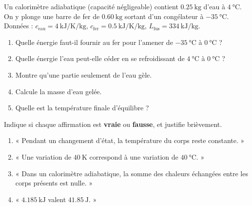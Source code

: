\documentclass[11pt,a4paper]{article}
\begin{document}
\begin{exo}
Un calorimètre adiabatique (capacité négligeable) contient $\qty{0.25}{\kilogram}$ d'eau à $\qty{4}{\celsius}$. On y plonge une barre de fer de $\qty{0.60}{\kilogram}$ sortant d'un congélateur à $\qty{-35}{\celsius}$. Données : $c_{\text{eau}}=\qty{4}{\kilo\joule\per\kelvin\per\kilogram}$, $c_{\text{fer}}=\qty{0.5}{\kilo\joule\per\kelvin\per\kilogram}$, $L_{\text{fus}}=\qty{334}{\kilo\joule\per\kilogram}$.
\begin{enumerate}[label=\alph*)]
  \item Quelle énergie faut-il fournir au fer pour l'amener de $\qty{-35}{\celsius}$ à $\qty{0}{\celsius}$ ?
  \item Quelle énergie l'eau peut-elle céder en se refroidissant de $\qty{4}{\celsius}$ à $\qty{0}{\celsius}$ ?
  \item Montre qu'une partie seulement de l'eau gèle.
  \item Calcule la masse d'eau gelée.
  \item Quelle est la température finale d'équilibre ?
\end{enumerate}
\end{exo}

\begin{exo}
Indique si chaque affirmation est \textbf{vraie} ou \textbf{fausse}, et justifie brièvement.
\begin{enumerate}[label=\alph*)]
  \item « Pendant un changement d'état, la température du corps reste constante. »
  \item « Une variation de $\qty{40}{\kelvin}$ correspond à une variation de $\qty{40}{\celsius}$. »
  \item « Dans un calorimètre adiabatique, la somme des chaleurs échangées entre les corps présents est nulle. »
  \item « $\qty{4.185}{\kilo\joule}$ valent $\qty{41.85}{\joule}$. »
\end{enumerate}
\end{exo}
\end{document}
